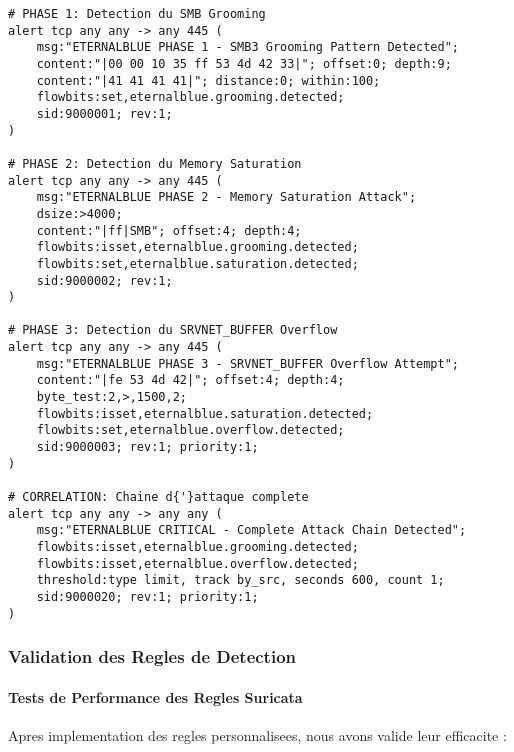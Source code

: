 \begin{lstlisting}[style=bashstyle,caption=Extrait des regles Suricata personnalisees pour EternalBlue]
# PHASE 1: Detection du SMB Grooming
alert tcp any any -> any 445 (
    msg:"ETERNALBLUE PHASE 1 - SMB3 Grooming Pattern Detected";
    content:"|00 00 10 35 ff 53 4d 42 33|"; offset:0; depth:9;
    content:"|41 41 41 41|"; distance:0; within:100;
    flowbits:set,eternalblue.grooming.detected;
    sid:9000001; rev:1;
)

# PHASE 2: Detection du Memory Saturation
alert tcp any any -> any 445 (
    msg:"ETERNALBLUE PHASE 2 - Memory Saturation Attack";
    dsize:>4000;
    content:"|ff|SMB"; offset:4; depth:4;
    flowbits:isset,eternalblue.grooming.detected;
    flowbits:set,eternalblue.saturation.detected;
    sid:9000002; rev:1;
)

# PHASE 3: Detection du SRVNET_BUFFER Overflow
alert tcp any any -> any 445 (
    msg:"ETERNALBLUE PHASE 3 - SRVNET_BUFFER Overflow Attempt";
    content:"|fe 53 4d 42|"; offset:4; depth:4;
    byte_test:2,>,1500,2;
    flowbits:isset,eternalblue.saturation.detected;
    flowbits:set,eternalblue.overflow.detected;
    sid:9000003; rev:1; priority:1;
)

# CORRELATION: Chaine d{'}attaque complete
alert tcp any any -> any any (
    msg:"ETERNALBLUE CRITICAL - Complete Attack Chain Detected";
    flowbits:isset,eternalblue.grooming.detected;
    flowbits:isset,eternalblue.overflow.detected;
    threshold:type limit, track by_src, seconds 600, count 1;
    sid:9000020; rev:1; priority:1;
)
\end{lstlisting}

\subsubsection{Validation des Regles de Detection}

\paragraph{Tests de Performance des Regles Suricata}

Apres implementation des regles personnalisees, nous avons valide leur efficacite :

